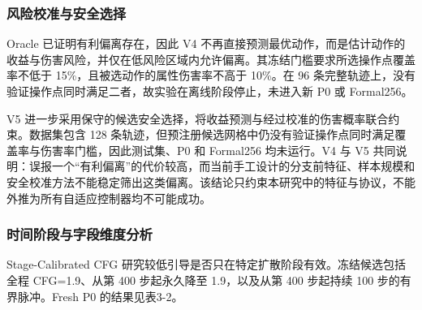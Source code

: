 \subsubsection{风险校准与安全选择}

Oracle 已证明有利偏离存在，因此 V4 不再直接预测最优动作，而是估计动作的收益与伤害风险，并仅在低风险区域内允许偏离。其冻结门槛要求所选操作点覆盖率不低于 15\%，且被选动作的属性伤害率不高于 10\%。在 96 条完整轨迹上，没有验证操作点同时满足二者，故实验在离线阶段停止，未进入新 P0 或 Formal256。

V5 进一步采用保守的候选安全选择，将收益预测与经过校准的伤害概率联合约束。数据集包含 128 条轨迹，但预注册候选网格中仍没有验证操作点同时满足覆盖率与伤害率门槛，因此测试集、P0 和 Formal256 均未运行。V4 与 V5 共同说明：误报一个``有利偏离''的代价较高，而当前手工设计的分支前特征、样本规模和安全校准方法不能稳定筛出这类偏离。该结论只约束本研究中的特征与协议，不能外推为所有自适应控制器均不可能成功。

\subsubsection{时间阶段与字段维度分析}

Stage-Calibrated CFG 研究较低引导是否只在特定扩散阶段有效。冻结候选包括全程 CFG=1.9、从第 400 步起永久降至 1.9，以及从第 400 步起持续 100 步的有界脉冲。Fresh P0 的结果见表3-2。


